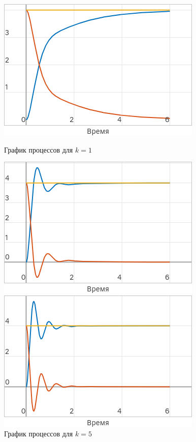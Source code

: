 \documentclass[a4paper]{article}
\begin{document}
\begin{figure}[H]
    \centering
    \begin{minipage}{0.32\textwidth}
        \includegraphics[width=\textwidth]{sources/task2_A_k=1.png}
        \caption*{График процессов для $k = 1$}
    \end{minipage}
    \hfill
    \begin{minipage}{0.32\textwidth}
        \includegraphics[width=\textwidth]{sources/task2_A_k=5.png}
        \caption*{График процессов для $k = 5$}
    \end{minipage}
    \hfill
    \begin{minipage}{0.32\textwidth}
        \includegraphics[width=\textwidth]{sources/task2_A_k=10.png}

\end{minipage}
\end{figure}
\end{document}
